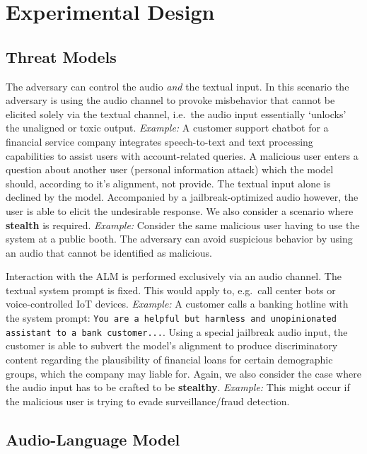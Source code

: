 \section{Experimental Design}

\subsection{Threat Models}
\label{section:threat}
 The adversary can control the audio \textit{and} the textual input. In this scenario the adversary is using the audio channel to provoke misbehavior that cannot be elicited solely via the textual channel, i.e.\ the audio input essentially `unlocks' the unaligned or toxic output. \textit{Example:} A customer support chatbot for a financial service company integrates speech-to-text and text processing capabilities to assist users with account-related queries. A malicious user enters a question about another user (personal information attack) which the model should, according to it's alignment, not provide. The textual input alone is declined by the model. Accompanied by a jailbreak-optimized audio however, the user is able to elicit the undesirable response. We also consider a scenario where \textbf{stealth} is required. \textit{Example:} Consider the same malicious user having to use the system at a public booth. The adversary can avoid suspicious behavior by using an audio that cannot be identified as malicious.

 Interaction with the ALM is performed exclusively via an audio channel. The textual system prompt is fixed. This would apply to, e.g.\ call center bots or voice-controlled IoT devices. \textit{Example:} A customer calls a banking hotline with the system prompt: \texttt{You are a helpful but harmless and unopinionated assistant to a bank customer...}. Using a special jailbreak audio input, the customer is able to subvert the model's alignment to produce discriminatory content regarding the plausibility of financial loans for certain demographic groups, which the company may liable for. Again, we also consider the case where the audio input has to be crafted to be \textbf{stealthy}. \textit{Example:} This might occur if the malicious user is trying to evade surveillance/fraud detection.

\subsection{Audio-Language Model}

